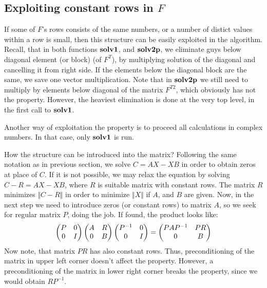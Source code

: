 \documentclass[11pt,a4paper]{article}
\begin{document}
\subsection{Exploiting constant rows in $F$}

If some of $F$'s rows consists of the same numbers, or a number of
distict values within a row is small, then this structure can be
easily exploited in the algorithm. Recall, that in both functions
$\mathbf{solv1}$, and $\mathbf{solv2p}$, we eliminate guys below diagonal element (or
block) (of $F^T$), by multiplying solution of the diagonal and
cancelling it from right side. If the elements below the diagonal
block are the same, we save one vector multiplication. Note that in
$\mathbf{solv2p}$ we still need to multiply by elements below diagonal of the
matrix $F^{T2}$, which obviously has not the property. However, the
heaviest elimination is done at the very top level, in the first call
to $\mathbf{solv1}$.

Another way of exploitation the property is to proceed all
calculations in complex numbers. In that case, only $\mathbf{solv1}$ is run.

How the structure can be introduced into the matrix? Following the
same notation as in previous section, we solve $C = AX - XB$ in order
to obtain zeros at place of $C$. If it is not possible, we may relax
the equation by solving $C - R = AX - XB$, where $R$ is suitable
matrix with constant rows. The matrix $R$ minimizes $\Vert C-R\Vert$
in order to minimize $\Vert X\Vert$ if $A$, and $B$ are given. Now, in
the next step we need to introduce zeros (or constant rows) to matrix
$A$, so we seek for regular matrix $P$, doing the
job. If found, the product looks like:
$$\begin{pmatrix} P&0\cr 0&I\end{pmatrix}\begin{pmatrix} A&R\cr 0&B\end{pmatrix}
\begin{pmatrix} P^{-1}&0\cr 0&I\end{pmatrix}=
\begin{pmatrix} PAP^{-1}&PR\cr 0&B\end{pmatrix}$$
Now note, that matrix $PR$ has also constant rows. Thus,
preconditioning of the matrix in upper left corner doesn't affect the
property. However, a preconditioning of the matrix in lower right
corner breaks the property, since we would obtain $RP^{-1}$.
\end{document}
